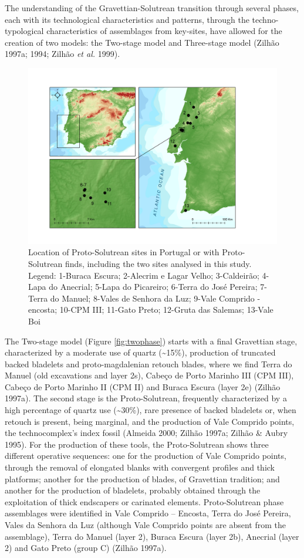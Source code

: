 \documentclass[12pt,twoside]{reedthesis}
\begin{document}
The understanding of the Gravettian-Solutrean transition through several phases, each with its technological characteristics and patterns, through the techno-typological characteristics of assemblages from key-sites, have allowed for the creation of two models: the Two-stage model and Three-stage model (Zilhão 1997a; 1994; Zilhão \emph{et al.} 1999).
\begin{figure}[H]

{\centering \includegraphics[width=0.8\linewidth]{figure/map_proto_solutrean} 

}

\caption{Location of Proto-Solutrean sites in Portugal or with Proto-Solutrean finds, including the two sites analysed in this study. Legend: 1-Buraca Escura; 2-Alecrim e Lagar Velho; 3-Caldeirão; 4-Lapa do Anecrial; 5-Lapa do Picareiro; 6-Terra do José Pereira; 7-Terra do Manuel; 8-Vales de Senhora da Luz; 9-Vale Comprido - encosta; 10-CPM III; 11-Gato Preto; 12-Gruta das Salemas; 13-Vale Boi}\label{fig:protomap}
\end{figure}
The Two-stage model (Figure \ref{fig:twophase}) starts with a final Gravettian stage, characterized by a moderate use of quartz (\textasciitilde15\%), production of truncated backed bladelets and proto-magdalenian retouch blades, where we find Terra do Manuel (old excavations and layer 2s), Cabeço de Porto Marinho III (CPM III), Cabeço de Porto Marinho II (CPM II) and Buraca Escura (layer 2e) (Zilhão 1997a). The second stage is the Proto-Solutrean, frequently characterized by a high percentage of quartz use (\textasciitilde30\%), rare presence of backed bladelets or, when retouch is present, being marginal, and the production of Vale Comprido points, the technocomplex's index fossil (Almeida 2000; Zilhão 1997a; Zilhão \& Aubry 1995). For the production of these tools, the Proto-Solutrean shows three different operative sequences: one for the production of Vale Comprido points, through the removal of elongated blanks with convergent profiles and thick platforms; another for the production of blades, of Gravettian tradition; and another for the production of bladelets, probably obtained through the exploitation of thick endscapers or carinated elements. Proto-Solutrean phase assemblages were identified in Vale Comprido -- Encosta, Terra do José Pereira, Vales da Senhora da Luz (although Vale Comprido points are absent from the assemblage), Terra do Manuel (layer 2), Buraca Escura (layer 2b), Anecrial (layer 2) and Gato Preto (group C) (Zilhão 1997a).
\end{document}
